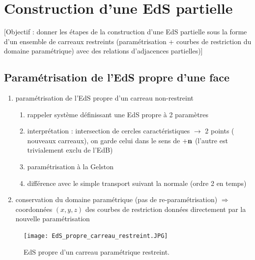 \section{Construction d'une EdS partielle}
\label{section:def_canal_surface}

[Objectif : donner les étapes de la construction d'une EdS partielle sous la forme d'un ensemble de carreaux restreints (paramétrisation + courbes de restriction du domaine paramétrique) avec des relations d'adjacences partielles)]




\subsection{Paramétrisation de l'EdS propre d'une face \brep}%
\label{section:parametrisation_eds_propre_face}
\begin{enumerate}
	\item paramétrisation de l'EdS propre d'un carreau non-restreint
	\begin{enumerate}
		\item rappeler système définissant une EdS propre à 2 paramètres
		\item interprétation : intersection de cercles caractéristiques $\to$ 2 points ( nouveaux carreaux), on garde celui dans le sens de $+\mathbf{n}$ (l'autre est trivialement exclu de l'EdB)
		\item paramétrisation à la Gelston \cite{gelston1995}
		\item différence avec le simple transport suivant la normale (ordre 2 en temps)
	\end{enumerate}
	\item conservation du domaine paramétrique (pas de re-paramétrisation) $\Rightarrow$ coordonnées $(x,y,z)$ des courbes de restriction données directement par la nouvelle paramétrisation
\end{enumerate}

\begin{figure}
	\centering
	\texttt{[image: EdS\_propre\_carreau\_restreint.JPG]}
	\caption{EdS propre d'un carreau paramétrique restreint.}
	\label{fig:EdS_propre_carreau_restreint}
\end{figure}



